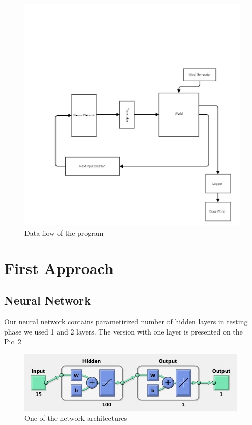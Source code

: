 \documentclass[a4paper]{article}
\begin{document}
	 \begin{figure}[!h]
		\centering	
		\includegraphics[width=1.2\textwidth]{pic/arch.jpg}
		\caption{Data flow of the program }
		\label{pic:flow}
	\end{figure}

\section{First Approach}
\subsection{Neural Network}
	Our neural network contains parametirized number of hidden layers in testing phase we 
	used 1 and 2 layers. The version with one layer is presented on the Pic~\ref{pic:networkExample}
	\begin{figure}[!h]
		\centering	
		\includegraphics[width=\textwidth]{pic/networkExample.jpg}
		\caption{One of the network architectures}
		\label{pic:networkExample}
	\end{figure}
	
\end{document}
